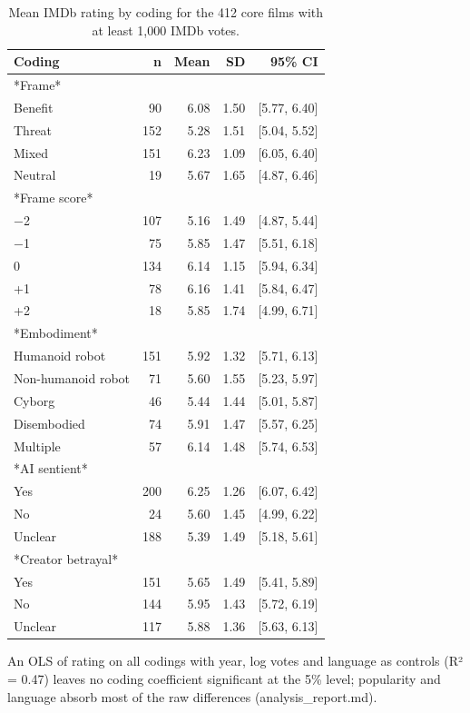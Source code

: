 \begin{table}[htbp]
\centering
\caption{Mean IMDb rating by coding for the 412 core films with at least 1,000 IMDb votes.}
\label{tab:imdb_rating_by_coding}
\begin{tabular}{lrrrr}
\toprule
Coding & n & Mean & SD & 95\% CI \\
\midrule
*Frame* &  &  &  &  \\
Benefit & 90 & 6.08 & 1.50 & [5.77, 6.40] \\
Threat & 152 & 5.28 & 1.51 & [5.04, 5.52] \\
Mixed & 151 & 6.23 & 1.09 & [6.05, 6.40] \\
Neutral & 19 & 5.67 & 1.65 & [4.87, 6.46] \\
*Frame score* &  &  &  &  \\
−2 & 107 & 5.16 & 1.49 & [4.87, 5.44] \\
−1 & 75 & 5.85 & 1.47 & [5.51, 6.18] \\
0 & 134 & 6.14 & 1.15 & [5.94, 6.34] \\
+1 & 78 & 6.16 & 1.41 & [5.84, 6.47] \\
+2 & 18 & 5.85 & 1.74 & [4.99, 6.71] \\
*Embodiment* &  &  &  &  \\
Humanoid robot & 151 & 5.92 & 1.32 & [5.71, 6.13] \\
Non-humanoid robot & 71 & 5.60 & 1.55 & [5.23, 5.97] \\
Cyborg & 46 & 5.44 & 1.44 & [5.01, 5.87] \\
Disembodied & 74 & 5.91 & 1.47 & [5.57, 6.25] \\
Multiple & 57 & 6.14 & 1.48 & [5.74, 6.53] \\
*AI sentient* &  &  &  &  \\
Yes & 200 & 6.25 & 1.26 & [6.07, 6.42] \\
No & 24 & 5.60 & 1.45 & [4.99, 6.22] \\
Unclear & 188 & 5.39 & 1.49 & [5.18, 5.61] \\
*Creator betrayal* &  &  &  &  \\
Yes & 151 & 5.65 & 1.49 & [5.41, 5.89] \\
No & 144 & 5.95 & 1.43 & [5.72, 6.19] \\
Unclear & 117 & 5.88 & 1.36 & [5.63, 6.13] \\
\bottomrule
\end{tabular}
\par\smallskip\footnotesize An OLS of rating on all codings with year, log votes and language as controls (R² = 0.47) leaves no coding coefficient significant at the 5\% level; popularity and language absorb most of the raw differences (analysis\_report.md).
\end{table}
